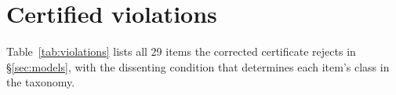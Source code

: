 \section{Certified violations}
\label{app:violations}

Table~\ref{tab:violations} lists all 29 items the corrected certificate rejects
in \S\ref{sec:models}, with the dissenting condition that determines each
item's class in the taxonomy.
